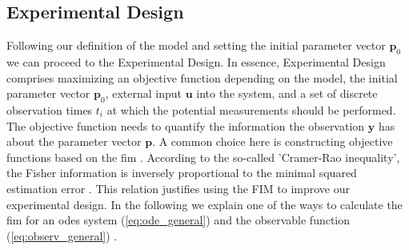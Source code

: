 \documentclass[graybox]{svmult}
\newcommand{\mbu}{\mathbf{u}}
\newcommand{\mbp}{\mathbf{p}}
\newcommand{\mby}{\mathbf{y}}
\begin{document}
\subsection*{Experimental Design}
Following our definition of the model and setting the initial parameter vector $\mbp_0$ we can proceed to the Experimental Design.
In essence, Experimental Design comprises maximizing an objective function depending on the model, the initial parameter vector $\mbp_0$, external input $\mbu$ into the system, and a set of discrete observation times $t_i$ at which the potential measurements should be performed.
The objective function needs to quantify the information the observation $\mby$ has about the parameter vector $\mbp$.
A common choice here is constructing objective functions based on the \acf{fim} \cite{lyTutorialFisher2017}.
According to the so-called 'Cramer-Rao inequality', the Fisher information is inversely proportional to the minimal squared estimation error \cite{friedenExploratoryData2010}.
This relation justifies using the FIM to improve our experimental design.
In the following we explain one of the ways to calculate the \ac{fim} for an \acp{ode} system (\ref{eq:ode_general}) and the observable function (\ref{eq:observ_general}) \cite{lyTutorialFisher2017}.
%
%
\end{document}

